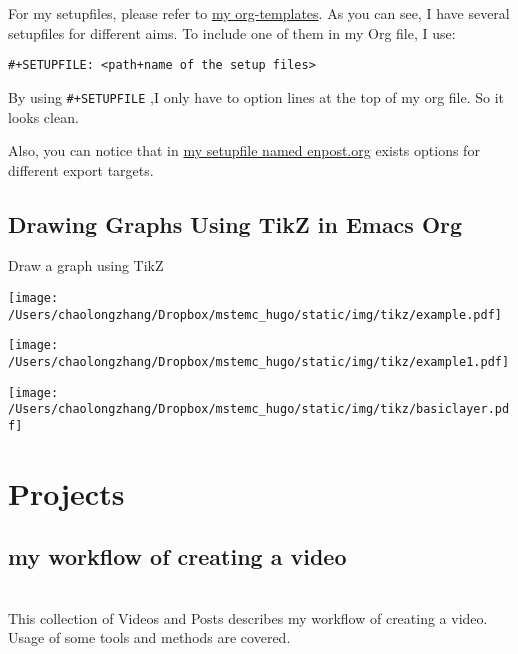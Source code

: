 \documentclass[koma,a4paper,captions=tableheading,11pt,listings-sv,microtype,paralist,colorlinks=true,urlcolor=blue,palatino]{org-article}
\begin{document}
For my setupfiles, please refer to \href{https://github.com/msteamc/.spacemacs.d/tree/master/org-templates}{my org-templates}. As you can see, I have
several setupfiles for different aims. To include one of them in my Org file, I
use:

\texttt{\#+SETUPFILE: <path+name of the setup files>}

By using \texttt{\#+SETUPFILE} ,I only have to option lines at the top of my org file.
So it looks clean.

Also, you can notice that in \href{https://github.com/msteamc/.spacemacs.d/blob/master/org-templates/enpost.org}{my setupfile named enpost.org} exists options for
different export targets.

\subsection{Drawing Graphs Using TikZ in Emacs Org}
\label{sec:org171ea2a}


Draw a graph using TikZ

\begin{center}
\texttt{[image: /Users/chaolongzhang/Dropbox/mstemc\_hugo/static/img/tikz/example.pdf]}
\end{center}

\begin{center}
\texttt{[image: /Users/chaolongzhang/Dropbox/mstemc\_hugo/static/img/tikz/example1.pdf]}
\end{center}

\begin{center}
\texttt{[image: /Users/chaolongzhang/Dropbox/mstemc\_hugo/static/img/tikz/basiclayer.pdf]}
\end{center}

\section{Projects}
\label{sec:org91fe676}


\subsection{my workflow of creating a video}
\label{sec:org7aa4f8b}
\hspace{0pt}\\


This collection of Videos and Posts describes my workflow of creating a video. Usage of some tools and methods are covered.
\end{document}
